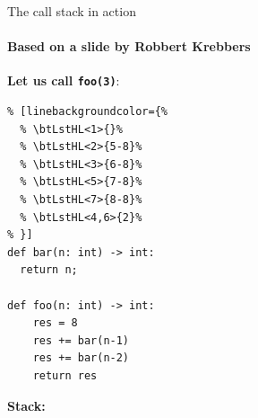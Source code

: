 \begin{frame}[fragile]{The call stack in action}
	\framesubtitle{Based on a slide by Robbert Krebbers}
\begin{minipage}[t]{0.5\textwidth}
\textbf{Let us call \lstinline|foo(3)|}:

\medskip
\begin{lstlisting}
% [linebackgroundcolor={%
  % \btLstHL<1>{}%
  % \btLstHL<2>{5-8}%
  % \btLstHL<3>{6-8}%
  % \btLstHL<5>{7-8}%
  % \btLstHL<7>{8-8}%
  % \btLstHL<4,6>{2}%
% }]
def bar(n: int) -> int:
  return n;

def foo(n: int) -> int:
	res = 8
	res += bar(n-1) 
	res += bar(n-2) 
	return res
\end{lstlisting}

\medskip
{}
\end{minipage}
\hfill
\begin{minipage}[t]{0.48\textwidth}
\textbf{Stack:}

\smallskip




\medskip
{}
\end{minipage}
\end{frame}

